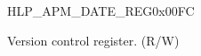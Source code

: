 \begin{register}{H}{LP\_APM\_DATE\_REG}{0x00FC}\label{regdesc:LPAPMDATEREG}
%
%
\regnewline%
\begin{regdesc}\begin{reglist}
\label{fielddesc:LPAPMDATE}\item [LP\_APM\_DATE] Version control register. (R/W)
\end{reglist}\end{regdesc}
\end{register}


